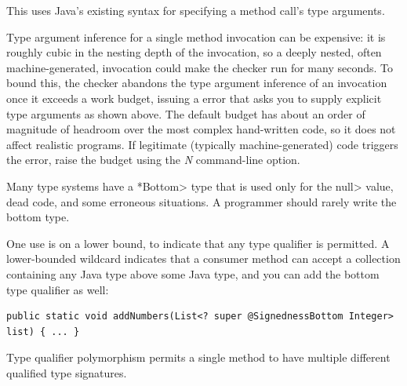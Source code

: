 \noindent
This uses Java's existing syntax for specifying a method call's type arguments.

Type argument inference for a single method invocation can be expensive: it is
roughly cubic in the nesting depth of the invocation, so a deeply nested, often
machine-generated, invocation could make the checker run for many seconds.  To
bound this, the checker abandons the type argument inference of an invocation
once it exceeds a work budget, issuing a 
error that asks you to supply explicit type arguments as shown above.  The
default budget has about an order of magnitude of headroom over the most complex
hand-written code, so it does not affect realistic programs.  If legitimate
(typically machine-generated) code triggers the error, raise the budget using
the \emph{N} command-line option.



Many type systems have a \<*Bottom> type that is used only for the \<null>
value, dead code, and some erroneous situations.  A programmer should
rarely write the bottom type.

One use is on a lower bound, to indicate that any type qualifier is
permitted.  A lower-bounded wildcard indicates that a consumer method can
accept a collection containing any Java type above some Java type, and you
can add the bottom type qualifier as well:

\begin{Verbatim}
public static void addNumbers(List<? super @SignednessBottom Integer> list) { ... }
\end{Verbatim}



Type qualifier polymorphism permits a single method to have multiple different qualified
type signatures.

